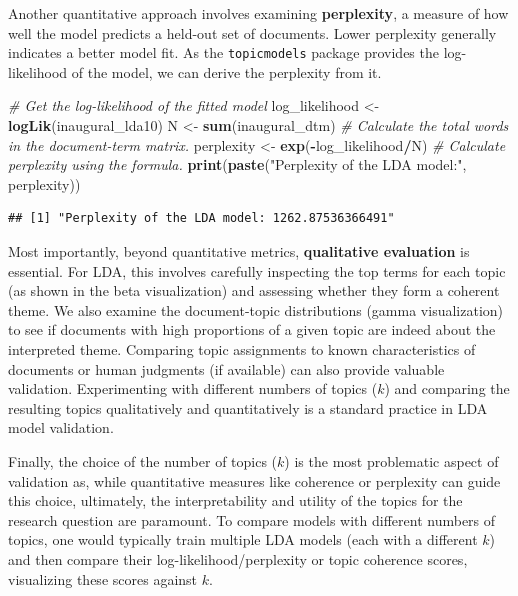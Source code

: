 \documentclass[
]{book}
\newenvironment{Shaded}{\begin{snugshade}}{\end{snugshade}}
\newcommand{\CommentTok}[1]{\textcolor[rgb]{0.56,0.35,0.01}{\textit{#1}}}
\newcommand{\FunctionTok}[1]{\textcolor[rgb]{0.13,0.29,0.53}{\textbf{#1}}}
\newcommand{\NormalTok}[1]{#1}
\newcommand{\OtherTok}[1]{\textcolor[rgb]{0.56,0.35,0.01}{#1}}
\newcommand{\SpecialCharTok}[1]{\textcolor[rgb]{0.81,0.36,0.00}{\textbf{#1}}}
\newcommand{\StringTok}[1]{\textcolor[rgb]{0.31,0.60,0.02}{#1}}
\begin{document}
Another quantitative approach involves examining \textbf{perplexity}, a measure of how well the model predicts a held-out set of documents.
Lower perplexity generally indicates a better model fit. As the \texttt{topicmodels} package provides the log-likelihood of the model, we can derive the perplexity from it.

\begin{Shaded}
\begin{Highlighting}[]
\CommentTok{\# Get the log{-}likelihood of the fitted model}
\NormalTok{log\_likelihood }\OtherTok{\textless{}{-}} \FunctionTok{logLik}\NormalTok{(inaugural\_lda10)}
\NormalTok{N }\OtherTok{\textless{}{-}} \FunctionTok{sum}\NormalTok{(inaugural\_dtm)  }\CommentTok{\# Calculate the total words in the document{-}term matrix.}
\NormalTok{perplexity }\OtherTok{\textless{}{-}} \FunctionTok{exp}\NormalTok{(}\SpecialCharTok{{-}}\NormalTok{log\_likelihood}\SpecialCharTok{/}\NormalTok{N)  }\CommentTok{\# Calculate perplexity using the formula.}
\FunctionTok{print}\NormalTok{(}\FunctionTok{paste}\NormalTok{(}\StringTok{"Perplexity of the LDA model:"}\NormalTok{, perplexity))}
\end{Highlighting}
\end{Shaded}

\begin{verbatim}
## [1] "Perplexity of the LDA model: 1262.87536366491"
\end{verbatim}

Most importantly, beyond quantitative metrics, \textbf{qualitative evaluation} is essential. For LDA, this involves carefully inspecting the top terms for each topic (as shown in the beta visualization) and assessing whether they form a coherent theme. We also examine the document-topic distributions (gamma visualization) to see if documents with high proportions of a given topic are indeed about the interpreted theme. Comparing topic assignments to known characteristics of documents or human judgments (if available) can also provide valuable validation. Experimenting with different numbers of topics (\(k\)) and comparing the resulting topics qualitatively and quantitatively is a standard practice in LDA model validation.

Finally, the choice of the number of topics (\(k\)) is the most problematic aspect of validation as, while quantitative measures like coherence or perplexity can guide this choice, ultimately, the interpretability and utility of the topics for the research question are paramount. To compare models with different numbers of topics, one would typically train multiple LDA models (each with a different \(k\)) and then compare their log-likelihood/perplexity or topic coherence scores, visualizing these scores against \(k\).
\end{document}
